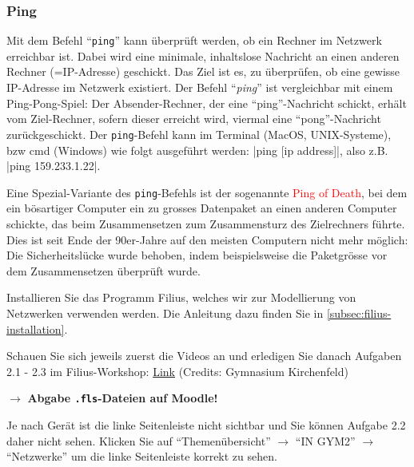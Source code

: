 \subsubsection{Ping}
Mit dem Befehl ``\texttt{ping}'' kann überprüft werden, ob ein Rechner im Netzwerk erreichbar ist. Dabei wird eine minimale, inhaltslose Nachricht an einen anderen Rechner (=IP-Adresse) geschickt. Das Ziel ist es, zu überprüfen, ob eine gewisse IP-Adresse im Netzwerk existiert. Der Befehl ``\textit{ping}'' ist vergleichbar mit einem Ping-Pong-Spiel: Der Absender-Rechner, der eine ``ping''-Nachricht schickt, erhält vom Ziel-Rechner, sofern dieser erreicht wird, viermal eine ``pong''-Nachricht zurückgeschickt. Der \texttt{ping}-Befehl kann im Terminal (MacOS, UNIX-Systeme), bzw cmd (Windows) wie folgt ausgeführt werden: \commandbox|ping [ip address]|, also z.B. \commandbox|ping 159.233.1.22|.

\begin{mycaution}
	Eine Spezial-Variante des \texttt{ping}-Befehls ist der sogenannte \textcolor{red}{\faSkull{} Ping of Death}, bei dem ein bösartiger Computer ein zu grosses Datenpaket an einen anderen Computer schickte, das beim Zusammensetzen zum Zusammensturz des Zielrechners führte. Dies ist seit Ende der 90er-Jahre auf den meisten Computern nicht mehr möglich: Die Sicherheitslücke wurde behoben, indem beispielsweise die Paketgrösse vor dem Zusammensetzen überprüft wurde.
\end{mycaution}

\begin{myexercise}
	Installieren Sie das Programm Filius, welches wir zur Modellierung von Netzwerken verwenden werden. Die Anleitung dazu finden Sie in \cref{subsec:filius-installation}.
\end{myexercise}

\begin{myexercise}
	Schauen Sie sich jeweils zuerst die Videos an und erledigen Sie danach Aufgaben 2.1 - 2.3 im Filius-Workshop: \href{https://informatik.mygymer.ch/base/?book=network}{Link} (Credits: Gymnasium Kirchenfeld)

	$\rightarrow$ \textbf{Abgabe \texttt{.fls}-Dateien auf Moodle!}
	\begin{mycaution}
		Je nach Gerät ist die linke Seitenleiste nicht sichtbar und Sie können Aufgabe 2.2 daher nicht sehen. Klicken Sie auf ``Themenübersicht'' $\rightarrow$  ``IN GYM2'' $\rightarrow$ ``Netzwerke'' um die linke Seitenleiste korrekt zu sehen.
	\end{mycaution}
\end{myexercise}

